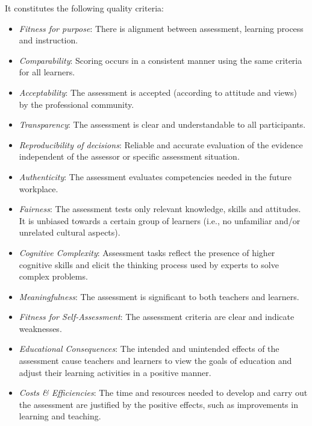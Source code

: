 It constitutes the following quality criteria:

\begin{itemize}
\item \emph{Fitness for purpose}: There is alignment between assessment, learning process and instruction.

\item \emph{Comparability}: Scoring occurs in a consistent manner using the same criteria for all learners.

\item \emph{Acceptability}: The assessment is accepted (according to attitude and views) by the professional community.

\item \emph{Transparency}: The assessment is clear and understandable to all participants. 

\item \emph{Reproducibility of decisions}: Reliable and accurate evaluation of the evidence independent of the assessor or specific assessment situation. 

\item \emph{Authenticity}: The assessment evaluates competencies needed in the future workplace.

\item \emph{Fairness}: The assessment tests only relevant knowledge, skills and attitudes. It is unbiased towards a certain group of learners (i.e., no unfamiliar and/or unrelated cultural aspects).

\item \emph{Cognitive Complexity}: Assessment tasks reflect the presence of higher cognitive skills and elicit the thinking process used by experts to solve complex problems.

\item \emph{Meaningfulness}: The assessment is significant to both teachers and learners. 

\item \emph{Fitness for Self-Assessment}: The assessment criteria are clear and indicate weaknesses.

\item \emph{Educational Consequences}: The intended and unintended effects of the assessment cause teachers and learners to view the goals of education and adjust their learning activities in a positive manner.

\item \emph{Costs \& Efficiencies}: The time and resources needed to develop and carry out the assessment are justified by the positive effects, such as improvements in learning and teaching.

\end{itemize}



